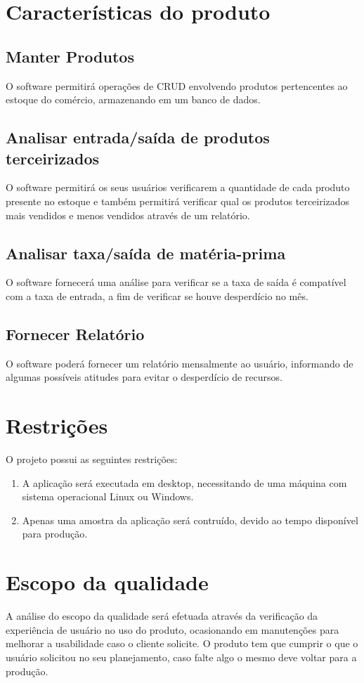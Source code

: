 \begin{appendices}
\begin{itemize}
	\end{itemize}


\section{Características do produto}

\subsection{Manter Produtos}
	O software permitirá operações de CRUD envolvendo produtos pertencentes ao estoque do comércio, armazenando em um banco de dados.

\subsection{Analisar entrada/saída de produtos terceirizados}
	O software permitirá os seus usuários verificarem a quantidade de cada produto presente no estoque e também permitirá verificar qual os produtos terceirizados mais vendidos e menos vendidos através de um relatório.

\subsection{Analisar taxa/saída de matéria-prima}
	O software fornecerá uma análise para verificar se a taxa de saída é compatível com a taxa de entrada, a fim de verificar se houve desperdício no mês.

\subsection{Fornecer Relatório}
	O software poderá fornecer um relatório mensalmente ao usuário, informando de algumas possíveis atitudes para evitar o desperdício de recursos.

\section{Restrições}
	O projeto possui as seguintes restrições:
	\begin{enumerate}
	\item A aplicação será executada em desktop, necessitando de uma máquina com sistema operacional Linux ou Windows.

	\item Apenas uma amostra da aplicação será contruído, devido ao tempo disponível para produção.
	\end{enumerate}


\section{Escopo da qualidade}
A análise do escopo da qualidade será efetuada através da verificação da experiência de usuário no uso do produto, ocasionando em manutenções para melhorar a usabilidade caso o cliente solicite.
O produto tem que cumprir o que o usuário solicitou no seu planejamento, caso falte algo o mesmo deve voltar para a produção.


\end{appendices}